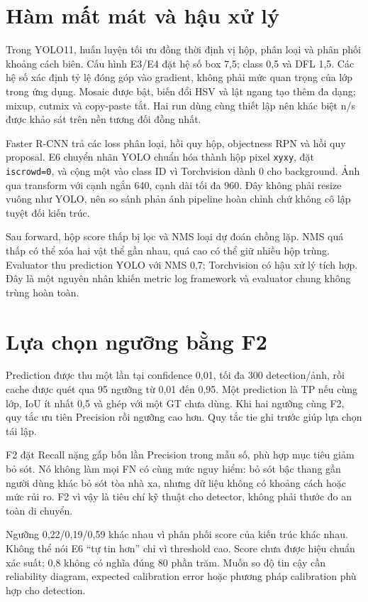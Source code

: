 \section{Hàm mất mát và hậu xử lý}
Trong YOLO11, huấn luyện tối ưu đồng thời định vị hộp, phân loại và phân phối khoảng cách biên. Cấu hình E3/E4 đặt hệ số box 7,5; class 0,5 và DFL 1,5. Các hệ số xác định tỷ lệ đóng góp vào gradient, không phải mức quan trọng của lớp trong ứng dụng. Mosaic được bật, biến đổi HSV và lật ngang tạo thêm đa dạng; mixup, cutmix và copy-paste tắt. Hai run dùng cùng thiết lập nên khác biệt n/s được khảo sát trên nền tương đối đồng nhất.

Faster R-CNN trả các loss phân loại, hồi quy hộp, objectness RPN và hồi quy proposal. E6 chuyển nhãn YOLO chuẩn hóa thành hộp pixel \texttt{xyxy}, đặt \texttt{iscrowd=0}, và cộng một vào class ID vì Torchvision dành 0 cho background. Ảnh qua transform với cạnh ngắn 640, cạnh dài tối đa 960. Đây không phải resize vuông như YOLO, nên so sánh phản ánh pipeline hoàn chỉnh chứ không cô lập tuyệt đối kiến trúc.

Sau forward, hộp score thấp bị lọc và NMS loại dự đoán chồng lặp. NMS quá thấp có thể xóa hai vật thể gần nhau, quá cao có thể giữ nhiều hộp trùng. Evaluator thu prediction YOLO với NMS 0,7; Torchvision có hậu xử lý tích hợp. Đây là một nguyên nhân khiến metric log framework và evaluator chung không trùng hoàn toàn.

\section{Lựa chọn ngưỡng bằng F2}
Prediction được thu một lần tại confidence 0,01, tối đa 300 detection/ảnh, rồi cache được quét qua 95 ngưỡng từ 0,01 đến 0,95. Một prediction là TP nếu cùng lớp, IoU ít nhất 0,5 và ghép với một GT chưa dùng. Khi hai ngưỡng cùng F2, quy tắc ưu tiên Precision rồi ngưỡng cao hơn. Quy tắc tie ghi trước giúp lựa chọn tái lập.

F2 đặt Recall nặng gấp bốn lần Precision trong mẫu số, phù hợp mục tiêu giảm bỏ sót. Nó không làm mọi FN có cùng mức nguy hiểm: bỏ sót bậc thang gần người dùng khác bỏ sót tòa nhà xa, nhưng dữ liệu không có khoảng cách hoặc mức rủi ro. F2 vì vậy là tiêu chí kỹ thuật cho detector, không phải thước đo an toàn di chuyển.

Ngưỡng 0,22/0,19/0,59 khác nhau vì phân phối score của kiến trúc khác nhau. Không thể nói E6 “tự tin hơn” chỉ vì threshold cao. Score chưa được hiệu chuẩn xác suất; 0,8 không có nghĩa đúng 80 phần trăm. Muốn so độ tin cậy cần reliability diagram, expected calibration error hoặc phương pháp calibration phù hợp cho detection.

